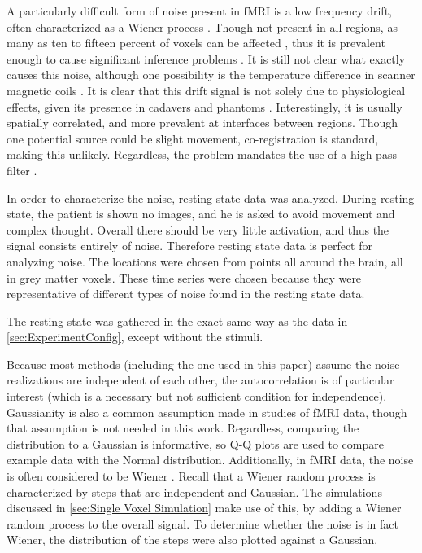 A particularly difficult form of noise present in \ac{fMRI} is a low frequency
drift, often characterized as a Wiener process \cite{Riera2004}.
Though not present in all regions, as many as ten to fifteen percent
of voxels can be affected \cite{Tanabe2002}, thus it is prevalent enough to cause significant
inference problems \cite{Smith2007}. It is still not
clear what exactly causes this noise, although one possibility is
the temperature difference in scanner magnetic coils \cite{Smith2007}.
It is clear that this drift signal is not solely
due to physiological effects, given its presence in cadavers and phantoms
\cite{Smith1999}. Interestingly, it is usually spatially correlated, and
more prevalent at interfaces between regions. Though one potential source
could be slight movement, co-registration is standard, making this unlikely.
Regardless, the problem mandates the use of a high pass filter \cite{Smith2007}.

In order to characterize the noise, resting state data was analyzed.
During resting state, the patient is shown no images, and he is asked
to avoid movement and complex thought.  Overall there should be
very little activation, and thus the signal consists entirely of noise.
Therefore resting state data is perfect for analyzing noise.
The locations were chosen from points all around the brain,
all in grey matter voxels. These time
series were chosen because they were representative of different types
of noise found in the resting state data.

The resting state was gathered in the exact same way as the data in
\autoref{sec:ExperimentConfig}, except without the stimuli.

Because most methods (including the one used in this paper)
assume the noise realizations are independent of each other, the autocorrelation
is of particular interest (which is a necessary but not
sufficient condition for independence). Gaussianity is also a common
assumption made in studies of \ac{fMRI} data, though that assumption is not
needed in this work. Regardless, comparing the distribution to a Gaussian
is informative, so Q-Q plots are used to compare example data with the
Normal distribution. Additionally, in \ac{fMRI} data, the noise is often considered
to be Wiener \cite{Riera2003}. Recall that a Wiener random process is
characterized by steps that are independent and Gaussian. The simulations discussed in
\autoref{sec:Single Voxel Simulation} make use of this,
by adding a Wiener random process to the overall signal. To determine
whether the noise is in fact Wiener, the distribution of
the steps were also plotted against a Gaussian.

